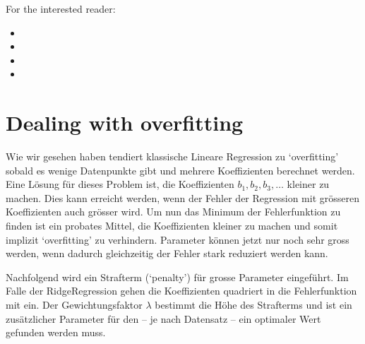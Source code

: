 \documentclass[letterpaper,10pt,english]{jupyterBook}
\begin{document}
\sphinxAtStartPar
For the interested reader:
\begin{itemize}
\item {} 
\sphinxAtStartPar
{}

\item {} 
\sphinxAtStartPar
{}

\item {} 
\sphinxAtStartPar
{}

\item {} 
\sphinxAtStartPar
{}

\end{itemize}


\chapter{Dealing with overfitting}
\label{\detokenize{Regression_Techniques:dealing-with-overfitting}}
\sphinxAtStartPar
Wie wir gesehen haben tendiert klassische Lineare Regression zu ‘overfitting’ sobald es wenige Datenpunkte gibt und mehrere Koeffizienten berechnet werden. 
Eine Lösung für dieses Problem ist, die Koeffizienten \(b_1, b_2, b_3, \ldots\) kleiner zu machen. Dies kann erreicht werden, wenn der Fehler der Regression mit grösseren Koeffizienten auch grösser wird. Um nun das Minimum der Fehlerfunktion zu finden ist ein probates Mittel, die Koeffizienten kleiner zu machen und somit implizit ‘overfitting’ zu verhindern.
Parameter können jetzt nur noch sehr gross werden, wenn dadurch gleichzeitig der Fehler stark reduziert werden kann.

\sphinxAtStartPar
Nachfolgend wird ein Strafterm (‘penalty’) für grosse Parameter eingeführt. Im Falle der Ridge\sphinxhyphen{}Regression gehen die Koeffizienten quadriert in die Fehlerfunktion mit ein. Der Gewichtungsfaktor \(\lambda\) bestimmt die Höhe des Strafterms und ist ein zusätzlicher Parameter für den – je nach Datensatz – ein optimaler Wert gefunden werden muss.
\end{document}
